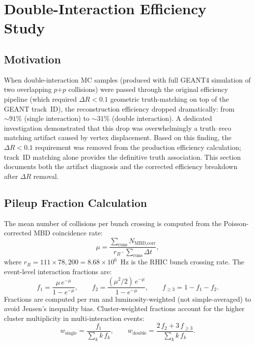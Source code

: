 \documentclass[11pt,a4paper]{article}
\newcommand{\DR}{\ensuremath{\Delta R}\xspace}
\newcommand{\pp}{\mbox{$p$+$p$}\xspace}
\begin{document}
\section{Double-Interaction Efficiency Study}
\label{sec:double_eff}

\subsection{Motivation}
\label{subsec:di_motivation}

When double-interaction MC samples (produced with full GEANT4 simulation of two
overlapping \pp collisions) were passed through the original efficiency pipeline
(which required $\DR < 0.1$ geometric truth-matching on top of the GEANT track~ID),
the reconstruction efficiency dropped dramatically: from ${\sim}91\%$ (single
interaction) to ${\sim}31\%$ (double interaction).
A dedicated investigation demonstrated that this drop was overwhelmingly a
truth--reco matching artifact caused by vertex displacement.
Based on this finding, the $\DR < 0.1$ requirement was removed from the production
efficiency calculation; track~ID matching alone provides the definitive truth
association.
This section documents both the artifact diagnosis and the corrected efficiency
breakdown after \DR removal.

\subsection{Pileup Fraction Calculation}
\label{subsec:pileup_fractions}

The mean number of collisions per bunch crossing is computed from the
Poisson-corrected MBD coincidence rate:
\begin{equation}
    \mu = \frac{\sum_{\text{runs}} N_{\text{MBD,corr}}}{r_B \cdot \sum_{\text{runs}} \Delta t},
\end{equation}
where $r_B = 111 \times 78{,}200 = 8.68 \times 10^{6}$~Hz is the RHIC bunch
crossing rate.
The event-level interaction fractions are:
\begin{equation}
    f_1 = \frac{\mu\, e^{-\mu}}{1 - e^{-\mu}}, \qquad
    f_2 = \frac{(\mu^2/2)\, e^{-\mu}}{1 - e^{-\mu}}, \qquad
    f_{\geq 3} = 1 - f_1 - f_2.
\end{equation}
Fractions are computed per run and luminosity-weighted (not simple-averaged) to
avoid Jensen's inequality bias.
Cluster-weighted fractions account for the higher cluster multiplicity in
multi-interaction events:
\begin{equation}
    w_{\text{single}} = \frac{f_1}{\sum_k k\, f_k}, \qquad
    w_{\text{double}} = \frac{2\, f_2 + 3\, f_{\geq 3}}{\sum_k k\, f_k}.
\end{equation}
\end{document}
